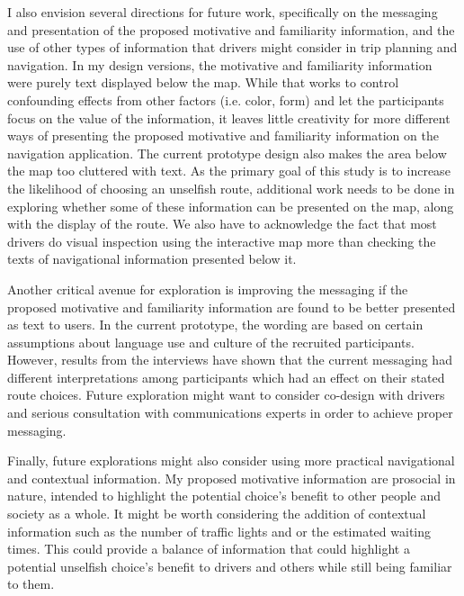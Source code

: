 I also envision several directions for future work, specifically on the messaging and presentation of the proposed motivative and familiarity information, and the use of other types of information that drivers might consider in trip planning and navigation. In my design versions, the motivative and familiarity information were purely text displayed below the map. While that works to control confounding effects from other factors (i.e. color, form) and let the participants focus on the value of the information, it leaves little creativity for more different ways of presenting the proposed motivative and familiarity information on the navigation application. The current prototype design also makes the area below the map too cluttered with text. As the primary goal of this study is to increase the likelihood of choosing an unselfish route, additional work needs to be done in exploring whether some of these information can be presented on the map, along with the display of the route. We also have to acknowledge the fact that most drivers do visual inspection using the interactive map more than checking the texts of navigational information presented below it.

Another critical avenue for exploration is improving the messaging if the proposed motivative and familiarity information are found to be better presented as text to users. In the current prototype, the wording are based on certain assumptions about language use and culture of the recruited participants. However, results from the interviews have shown that the current messaging had different interpretations among participants which had an effect on their stated route choices. Future exploration might want to consider co-design with drivers and serious consultation with communications experts in order to achieve proper messaging. 

Finally, future explorations might also consider using more practical navigational and contextual information. My proposed motivative information are prosocial in nature, intended to highlight the potential choice's benefit to other people and society as a whole. It might be worth considering the addition of contextual information such as the number of traffic lights and or the estimated waiting times. This could provide a balance of information that could highlight a potential unselfish choice's benefit to drivers and others while still being familiar to them.

